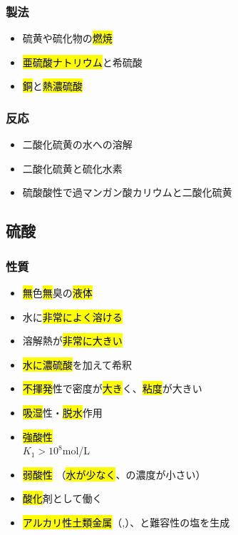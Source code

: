\subsubsection{製法}
\begin{itemize}
      \item 硫黄や硫化物の\hl{燃焼} \K\\
      \item \hl{亜硫酸ナトリウム}と{希硫酸}\\
      \item \hl{銅}と\hl{熱濃硫酸}\\
\end{itemize}
\subsubsection{反応}
\begin{itemize}
      \item 二酸化硫黄の水への溶解\\
      \item 二酸化硫黄と硫化水素\\
      \item 硫酸酸性で過マンガン酸カリウムと二酸化硫黄\\
\end{itemize}
\newpage
\twocolumn
\subsection{硫酸}
\subsubsection{性質}
\begin{itemize}
      \item \hl{無}色\hl{無}臭の\hl{液体}
      \item 水に\hl{非常によく溶ける}
      \item 溶解熱が\hl{非常に大きい}
      \item \hl{水に濃硫酸}を加えて希釈
      \item \hl{不揮発}性で密度が\hl{大き}く、\hl{粘度}が大きい 
      \item \hl{吸湿}性・\hl{脱水}作用 
      \item \hl{強酸性} \\
            \hl{} \hfill $K_{1}>10^8$mol/L
      \item \hl{弱酸性}  （\hl{水が少なく}、\hl{}の濃度が小さい）
      \item \hl{酸化}剤として働く \\
      \item \hl{アルカリ性土類金属}（\hl{},\hl{}）、\hl{}と難容性の塩を生成 
\end{itemize}
